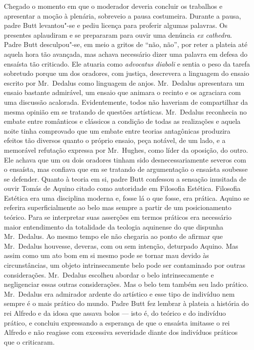 Chegado o momento em que o moderador deveria concluir os trabalhos e apresentar
a moção à plenária, sobreveio a pausa costumeira.  Durante a pausa, padre Butt
levantou"-se e pediu licença para proferir algumas palavras.  Os presentes
aplaudiram e se prepararam para ouvir uma denúncia \textit{ex cathedra}.  Padre
Butt desculpou"-se, em meio a gritos de “não, não”, por reter a plateia até
aquela hora tão avançada, mas achava necessário dizer uma palavra em defesa do
ensaísta tão criticado.  Ele atuaria como \textit{advocatus diaboli} e sentia o
peso da tarefa sobretudo porque um dos oradores, com justiça, descrevera a
linguagem do ensaio escrito por Mr.~Dedalus como linguagem de anjos.  
Mr.~Dedalus apresentara um ensaio bastante admirável, um ensaio que animara o
recinto e os agraciara com uma discussão acalorada.  Evidentemente, todos não
haveriam de compartilhar da mesma opinião em se tratando de \label{questoes"-artisticas} questões
artísticas.  Mr.~Dedalus reconhecia no embate entre românticos e clássicos a
condição de todas as realizações e aquela noite tinha comprovado que um embate
entre teorias antagônicas produzira efeitos tão diversos quanto o próprio
ensaio, peça notável, de um lado, e a memorável refutação expressa por 
Mr.~Hughes, como líder da oposição, do outro.  Ele achava que um ou dois oradores
tinham sido desnecessariamente severos com o ensaísta, mas confiava que em se
tratando de argumentação o ensaísta soubesse se defender.  Quanto à teoria em
si, padre Butt confessou a sensação inusitada de ouvir Tomás de Aquino citado
como autoridade em Filosofia Estética.  Filosofia Estética era uma disciplina
moderna e, fosse lá o que fosse, era prática.  Aquino se referira
superficialmente ao belo mas sempre a partir de um posicionamento teórico.
Para se interpretar suas asserções em termos práticos era necessário maior
entendimento da totalidade da teologia aquinense do que dispunha Mr.~Dedalus.
Ao mesmo tempo ele não chegaria ao ponto de afirmar que Mr.~Dedalus houvesse,
deveras, com ou sem intenção, deturpado Aquino.  Mas assim como um ato bom em
si mesmo pode se tornar mau devido às circunstâncias, um objeto intrinsecamente
belo pode ser contaminado por outras considerações.  Mr.~Dedalus escolheu
abordar o belo intrinsecamente e negligenciar essas outras considerações.  Mas
o belo tem também seu lado prático.  Mr.~Dedalus era admirador ardente do
artístico e esse tipo de indivíduo nem sempre é o mais prático do mundo.  Padre
Butt fez lembrar à plateia a história do rei Alfredo e da idosa que assava
bolos --- isto é, do teórico e do indivíduo prático, e concluiu expressando a
esperança de que o ensaísta imitasse o rei Alfredo e não reagisse com excessiva
severidade diante dos indivíduos práticos que o criticaram.

